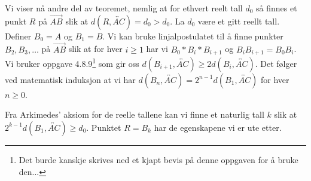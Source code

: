 \begin{oppgave}[4.8.10]
    Vi viser nå andre del av teoremet, nemlig at for ethvert reelt tall $d_0$ så finnes et punkt $R$ på $\overrightarrow{AB}$ slik at $d(R, \overleftrightarrow{AC})=d_0>d_0$. 
    La $d_0$ være et gitt reellt tall. 
    Definer $B_0=A$ og $B_1=B$. 
    Vi kan bruke linjalpostulatet til å finne punkter $B_2, B_3, \ldots$ på $\overrightarrow{AB}$ slik at for hver $i\geq 1$ har vi $B_0\ast B_i\ast B_{i+1}$ og $B_i B_{i+1}=B_0 B_i$. 
    Vi bruker oppgave 4.8.9\footnote{Det burde kanskje skrives ned et kjapt bevis på denne oppgaven for å bruke den...} som gir oss $d(B_{i+1}, \overleftrightarrow{AC})\geq 2 d(B_i, \overleftrightarrow{AC})$. 
    Det følger ved matematisk induksjon at vi har $d(B_n, \overleftrightarrow{AC})=2^{n-1}d(B_1, \overleftrightarrow{AC})$ for hver $n\geq 0$. 

    Fra Arkimedes' aksiom for de reelle tallene kan vi finne et naturlig tall $k$ slik at $2^{k-1}d(B_1, \overleftrightarrow{AC})\geq d_0$. 
    Punktet $R=B_k$ har de egenskapene vi er ute etter. 
\end{oppgave}

